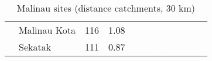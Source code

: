 \begin{table}[ht]
\begin{tabular}{C{0.03\textwidth}C{0.12\textwidth}C{0.09\textwidth}C{0.08\textwidth}C{0.08\textwidth}C{0.08\textwidth}C{0.07\textwidth}C{0.07\textwidth}C{0.07\textwidth}C{0.07\textwidth}}
   & Malinau Kota & 116 & \textcolor[HTML]{000000}{1.08} & \textcolor[HTML]{FFFFFF}{0.32} & \textcolor[HTML]{FFFFFF}{3} &  &  &  &  \\ 
   & Sekatak & 111 & \textcolor[HTML]{000000}{0.87} & \textcolor[HTML]{FFFFFF}{0.33} & \textcolor[HTML]{FFFFFF}{3} &  &  &  &  \\ 
  \end{tabular}
\endgroup
\caption{Malinau sites (distance catchments, 30 km)} 
\label{tab:malinau_dist}
\end{table}
